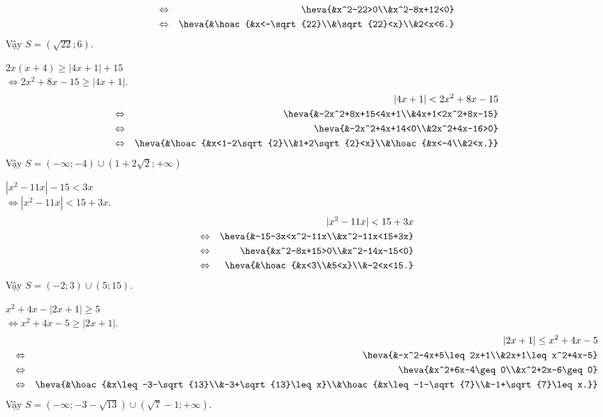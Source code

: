 \begin{bt}
{\begin{listEX}[2]
\begin{eqnarray*}
				&\Leftrightarrow & \heva{&x^2-22>0\\&x^2-8x+12<0}\\
				&\Leftrightarrow & \heva{&\hoac{&x<-\sqrt{22}\\&\sqrt{22}<x}\\&2<x<6.}		
			\end{eqnarray*}	
			Vậy $S= \left(\sqrt{22};6\right).$
			\item $2x(x+4)\geq |4x+1|+15$\\$\Leftrightarrow 2x^2+8x-15\geq |4x+1|$.
			\allowdisplaybreaks
			\begin{eqnarray*}
				&&	|4x+1|<2x^2+8x-15\\
				&\Leftrightarrow & \heva{&-2x^2+8x+15<4x+1\\&4x+1<2x^2+8x-15}\\
				&\Leftrightarrow & \heva{&-2x^2+4x+14<0\\&2x^2+4x-16>0}\\
				&\Leftrightarrow & \heva{&\hoac{&x<1-2\sqrt{2}\\&1+2\sqrt{2}<x}\\&\hoac{&x<-4\\&2<x.}}
			\end{eqnarray*}	
			Vậy $S=(-\infty;-4)\cup (1+2\sqrt{2};+\infty)$
			\item $|x^2-11x|-15<3x$\\$\Leftrightarrow |x^2-11x|<15+3x$.
			\allowdisplaybreaks
			\begin{eqnarray*}
				&&	|x^2-11x|<15+3x\\
				&\Leftrightarrow & \heva{&-15-3x<x^2-11x\\&x^2-11x<15+3x}\\
				&\Leftrightarrow & \heva{&x^2-8x+15>0\\&x^2-14x-15<0}\\
				&\Leftrightarrow & \heva{&\hoac{&x<3\\&5<x}\\&-2<x<15.}\\
			\end{eqnarray*}	
			Vậy $S=(-2;3)\cup (5;15).$
			\item $x^2+4x-|2x+1|\geq 5$\\$\Leftrightarrow x^2+4x-5\geq |2x+1|$.
			\allowdisplaybreaks
			\begin{eqnarray*}
				&&	|2x+1|\leq x^2+4x-5\\
				&\Leftrightarrow & \heva{&-x^2-4x+5\leq 2x+1\\&2x+1\leq x^2+4x-5}\\
				&\Leftrightarrow & \heva{&x^2+6x-4\geq 0\\&x^2+2x-6\geq 0}\\
				&\Leftrightarrow & \heva{&\hoac{&x\leq -3-\sqrt{13}\\&-3+\sqrt{13}\leq x}\\&\hoac{&x\leq -1-\sqrt{7}\\&-1+\sqrt{7}\leq x.}}\\
			\end{eqnarray*}	
			Vậy $S=(-\infty;-3-\sqrt{13})\cup (\sqrt{7}-1;+\infty).$
		\end{listEX}
	}
\end{bt}

